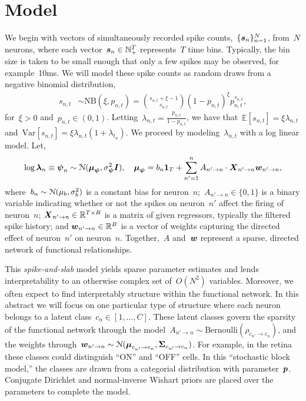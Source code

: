 \documentclass[aos,noinfoline]{imsart} %
\begin{document}
\section{Model}
We begin with vectors of simultaneously recorded spike counts,~$\{\boldsymbol{s}_n\}_{n=1}^N$, from~$N$ neurons, where each vector~${\boldsymbol{s}_n\in\mathbb{N}^T_{+}}$ represents~$T$ time bins. Typically, the bin size is taken to be small enough that only a few spikes may be observed, for example~10ms. We will model these spike counts as random draws from a negative binomial distribution,
\begin{align}
s_{n,t} &\sim \text{NB}(\xi, p_{n,t}) = {{s_{n,t}+\xi-1}\choose{s_{n,t}}} (1-p_{n,t})^\xi p_{n,t}^{s_{n,t}},
\end{align}
for~$\xi>0$ and~${p_{n,t}\in(0,1)}$. Letting~${\lambda_{n,t}=\frac{p_{n,t}}{1-p_{n,t}}}$, we have that~$\mathbb{E}[s_{n,t}]=\xi\lambda_{n,t}$ and~${\text{Var}[s_{n,t}] = \xi\lambda_{n,t}(1+\lambda_{t_n})}$.  We proceed by modeling~$\lambda_{n,t}$ with a log linear model. Let,
\begin{align}
 \log \blambda_{n} \equiv \bpsi_{n} \sim \distNormal(\bmu_{\bpsi}, \sigma_{\bpsi}^2 \bI),
\quad
\bmu_{\bpsi} = b_{n}\bone_T + \sum_{n'=1}^n  A_{n'\to n} \cdot \bX_{n'\to n} \bw_{n' \to n},
\end{align}
where~${b_n\sim\mathcal{N}(\mu_b, \sigma_b^2)}$ is a constant bias for neuron~$n$;\;~${A_{n'\to n}\in\{0,1\}}$ is a binary variable indicating whether or not the spikes on neuron~$n'$ affect the firing of neuron~$n$; ${\boldsymbol{X}_{n'\to n}\in \mathbb{R}^{T\times B}}$ is a matrix of given regressors, typically the filtered spike history; and ${\boldsymbol{w}_{n'\to n}\in \mathbb{R}^B}$ is a vector of weights capturing the directed effect of neuron~$n'$ on neuron~$n$. Together,~$A$ and~$\boldsymbol{w}$ represent a sparse, directed network of functional relationships.

This \emph{spike-and-slab} model yields sparse parameter estimates and lends interpretability to an otherwise complex set of~$O(N^2)$ variables.  Moreover, we often expect to find interpretably structure within the functional network. In this abstract we will focus on one particular type of structure where each neuron belongs to a latent class~${c_n\in[1,\ldots,C]}$. These latent classes govern the sparsity of the functional network through the model~${A_{n' \to n} \sim \text{Bernoulli}(\rho_{c_{n'}\to c_n})}$, and the weights through~${\boldsymbol{w}_{n' \to n} \sim \mathcal{N}(\boldsymbol{\mu}_{c_{n'}\to c_n}, \boldsymbol{\Sigma}_{c_{n'}\to c_n})}$. 
For example, in the retina these classes could distinguish ``ON'' and ``OFF'' cells. In this ``stochastic block model,'' the classes are drawn from a categorial distribution with parameter~$\boldsymbol{p}$. Conjugate Dirichlet and normal-inverse Wishart priors are placed over the parameters to complete the model.
\end{document}
